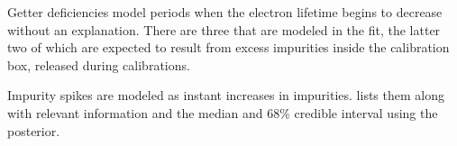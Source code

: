 Getter deficiencies model periods when the electron lifetime begins to decrease without an explanation.  There are three that are modeled
in the fit, the latter two of which are expected to result from excess impurities inside the calibration box, released during 
calibrations.

\bgroup
\def\arraystretch{1.2}
\begin{table}
\centering
{}
\caption{Getter deficiencies medians and 68\% credible intervals.  The first getter deficiency is not understood, but the latter two are
thought to result from high levels of impurities inside the calibration source box, since they occur simultaneously with the start of
 calibrations.}
\label{tab:elifetime_fit_results_posteriors_getter_deficiencies}
\end{table}
\egroup

Impurity spikes are modeled as instant increases in impurities.   lists
them along with relevant information and the median and 68\% credible interval using the posterior.

